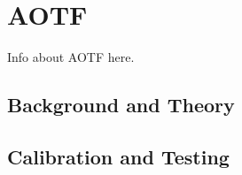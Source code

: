 \section{AOTF}

Info about AOTF here.

\subsection{Background and Theory}
\subsection{Calibration and Testing} 